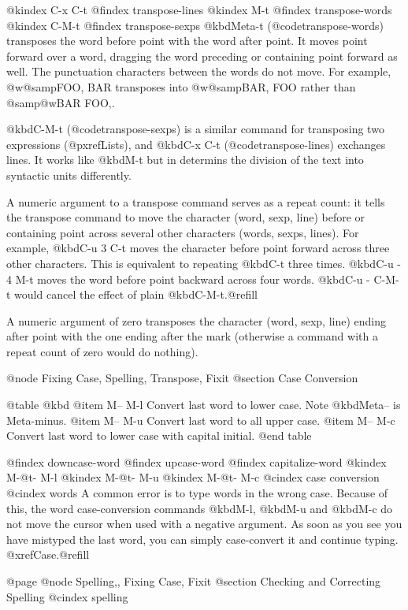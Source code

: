 {{{{{{{{{{{{{{{{@kindex C-x C-t
@findex transpose-lines
@kindex M-t
@findex transpose-words
@kindex C-M-t
@findex transpose-sexps
  @kbd{Meta-t} (@code{transpose-words}) transposes the word before point
with the word after point.  It moves point forward over a word, dragging
the word preceding or containing point forward as well.  The punctuation
characters between the words do not move.  For example, @w{@samp{FOO, BAR}}
transposes into @w{@samp{BAR, FOO}} rather than @samp{@w{BAR FOO,}}.

  @kbd{C-M-t} (@code{transpose-sexps}) is a similar command for transposing
two expressions (@pxref{Lists}), and @kbd{C-x C-t} (@code{transpose-lines})
exchanges lines.  It works like @kbd{M-t} but in determins the
division of the text into syntactic units differently.

  A numeric argument to a transpose command serves as a repeat count: it
tells the transpose command to move the character (word, sexp, line) before
or containing point across several other characters (words, sexps, lines).
For example, @kbd{C-u 3 C-t} moves the character before point forward
across three other characters.  This is equivalent to repeating @kbd{C-t}
three times.  @kbd{C-u - 4 M-t} moves the word before point backward across
four words.  @kbd{C-u - C-M-t} would cancel the effect of plain
@kbd{C-M-t}.@refill

  A numeric argument of zero transposes the character (word, sexp, line)
ending after point with the one ending after the mark (otherwise a
command with a repeat count of zero would do nothing).

@node Fixing Case, Spelling, Transpose, Fixit
@section Case Conversion

@table @kbd
@item M-- M-l
Convert last word to lower case.  Note @kbd{Meta--} is Meta-minus.
@item M-- M-u
Convert last word to all upper case.
@item M-- M-c
Convert last word to lower case with capital initial.
@end table

@findex downcase-word
@findex upcase-word
@findex capitalize-word
@kindex M-@t{-} M-l
@kindex M-@t{-} M-u
@kindex M-@t{-} M-c
@cindex case conversion
@cindex words
  A  common error is to type words in the wrong case.  Because of this,
the word case-conversion commands @kbd{M-l}, @kbd{M-u} and @kbd{M-c} do
not move the cursor when used with a negative argument.
As soon as you see you have mistyped the last word, you can simply
case-convert it and continue typing.  @xref{Case}.@refill

@page
@node Spelling,, Fixing Case, Fixit
@section Checking and Correcting Spelling
@cindex spelling

}}}}}}}}}}}}}}}}
